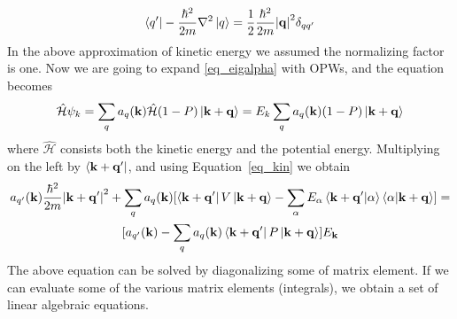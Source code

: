 \begin{equation}
\label{eq_kin}
	\bra{q'}-\frac{\hbar^2}{2m}\nabla^2\ket{q} = \frac{1}{2}\frac{\hbar^2}{2m} \abs{\vb{q}}^2 \delta_{qq'}
\end{equation}
In the above approximation of kinetic energy we assumed the normalizing factor is one.
Now we are going to expand \ref{eq_eigalpha} with OPWs, and the \schrod equation becomes
\begin{equation}
\hat{\mathcal{H}}\psi_k = \sum_q a_q (\vb{k})\hat{\mathcal{H}}(1-P)\ket{\vb{k}+\vb{q}}=E_k\sum_q a_q (\vb{k}) (1-P) \ket{\vb{k}+\vb{q}}
\end{equation}
where $\hat{\mathcal{H}}$ consists both the kinetic energy and the potential energy. Multiplying on the left by $\bra{\vb{k}+\vb{q}'}$, and using Equation~\eqref{eq_kin} we obtain
\begin{multline}
\label{eq_opwd}
a_{q'} (\vb{k}) \frac{\hbar^2}{2m}\abs{\vb{k}+\vb{q}'}^2 + \sum_q a_q (\vb{k})[\bra{\vb{k}+\vb{q}'}V\ket{\vb{k}+\vb{q}} - \sum_{\alpha} E_{\alpha} \braket{\vb{k}+\vb{q}'}{\alpha}\braket{\alpha}{\vb{k}+\vb{q}}]
	= \\
 [a_{q'} (\vb{k}) - \sum_q a_q (\vb{k}) \bra{\vb{k}+\vb{q}'}P\ket{\vb{k}+\vb{q}}]E_{\vb{k}}  
\end{multline}
The above equation can be solved by diagonalizing some of matrix element. If we can evaluate some of the various matrix elements (integrals), we obtain a set of linear algebraic equations.




% 

